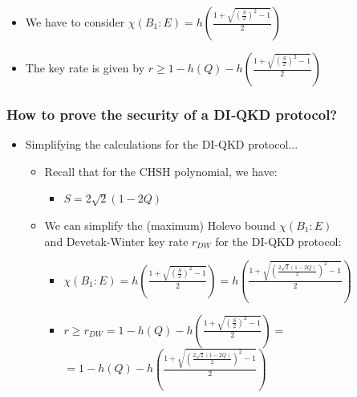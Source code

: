 \documentclass{beamer}
\begin{document}
\begin{frame}
\begin{itemize}
\begin{itemize}
                    \begin{itemize}
                        \item We have to consider $\chi({B}_{1}:E) = h\left( \frac{1 + \sqrt{{(\frac{S}{2})}^{2} - 1}}{2} \right)$
                        \item The key rate is given by $r \geq 1 - h(Q) - h\left( \frac{1 + \sqrt{{(\frac{S}{2})}^{2} - 1}}{2} \right)$
                    \end{itemize}
                \end{itemize}
            \end{itemize}
		\end{frame}

		\begin{frame}
			\frametitle{\large How to prove the security of a DI‑QKD protocol?}

            \vspace{2ex}
            \begin{itemize}
                \item Simplifying the calculations for the DI-QKD protocol...
                \begin{itemize}
                    \item Recall that for the CHSH polynomial, we have:
                    \begin{itemize}
                        \item $S = 2 \sqrt{2}(1 - 2Q)$
                    \end{itemize}
                    \vspace{1ex}
                    \item We can simplify the (maximum) Holevo bound $\chi({B}_{1}:E)$\\ and Devetak-Winter key rate ${r}_{DW}$ for the DI-QKD protocol:
                    \begin{itemize}
                        \item $\chi({B}_{1}:E) = h\left( \frac{1 + \sqrt{{(\frac{S}{2})}^{2} - 1}}{2} \right) = h\left( \frac{1 + \sqrt{{\left(\frac{ 2 \sqrt{2}(1 - 2Q) }{2}\right)}^{2} - 1}}{2} \right)$
                        \item $r \geq {r}_{DW} = 1 - h(Q) - h\left( \frac{1 + \sqrt{{(\frac{S}{2})}^{2} - 1}}{2} \right) = $\\
                        \vspace{0.5ex}
                        \hspace{6.8ex}$= 1 - h(Q) - h\left( \frac{1 + \sqrt{{\left(\frac{ 2 \sqrt{2}(1 - 2Q) }{2}\right)}^{2} - 1}}{2} \right)$
                    \end{itemize}
                \end{itemize}
            \end{itemize}
            
		\end{frame}
\end{document}
